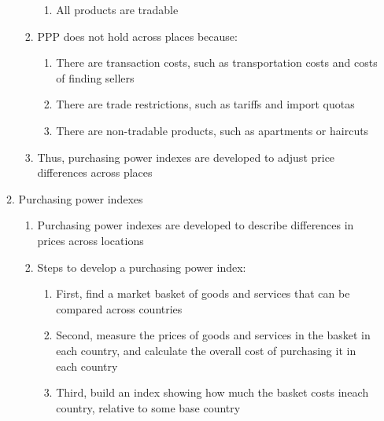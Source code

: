 \documentclass[12pt]{article}
\begin{document}
\begin{enumerate}
\begin{enumerate}
\begin{enumerate}
\begin{enumerate}
                  \item All products are tradable

                \end{enumerate}

              \item PPP does not hold across places because:

                \begin{enumerate}

                  \item There are transaction costs, such as transportation costs and costs of finding sellers

                  \item There are trade restrictions, such as tariffs and import quotas

                  \item There are non-tradable products, such as apartments or haircuts

                \end{enumerate}

              \item Thus, purchasing power indexes are developed to adjust price differences across places

            \end{enumerate}

          \item Purchasing power indexes

            \begin{enumerate}

              \item Purchasing power indexes are developed to describe differences in prices across locations

              \item Steps to develop a purchasing power index:

                \begin{enumerate}

                  \item First, find a market basket of goods and services that can be compared across countries

                  \item Second, measure the prices of goods and services in the basket in each country, and calculate the overall cost of purchasing it in each country

                  \item Third, build an index showing how much the basket costs ineach country, relative to some base country


\end{enumerate}
\end{enumerate}
\end{enumerate}
\end{enumerate}
\end{document}
